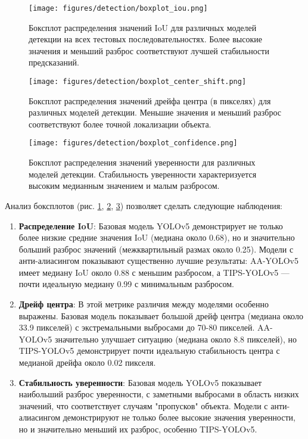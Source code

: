 \begin{figure}[ht]
\centering
\texttt{[image: figures/detection/boxplot\_iou.png]}
\caption{Боксплот распределения значений IoU для различных моделей детекции на всех тестовых последовательностях. Более высокие значения и меньший разброс соответствуют лучшей стабильности предсказаний.}
\label{fig:boxplot_iou}
\end{figure}

\begin{figure}[ht]
\centering
\texttt{[image: figures/detection/boxplot\_center\_shift.png]}
\caption{Боксплот распределения значений дрейфа центра (в пикселях) для различных моделей детекции. Меньшие значения и меньший разброс соответствуют более точной локализации объекта.}
\label{fig:boxplot_center_shift}
\end{figure}

\begin{figure}[ht]
\centering
\texttt{[image: figures/detection/boxplot\_confidence.png]}
\caption{Боксплот распределения значений уверенности для различных моделей детекции. Стабильность уверенности характеризуется высоким медианным значением и малым разбросом.}
\label{fig:boxplot_confidence}
\end{figure}

Анализ боксплотов (рис. \ref{fig:boxplot_iou}, \ref{fig:boxplot_center_shift}, \ref{fig:boxplot_confidence}) позволяет сделать следующие наблюдения:

\begin{enumerate}
    \item \textbf{Распределение IoU}: Базовая модель YOLOv5 демонстрирует не только более низкие средние значения IoU (медиана около 0.68), но и значительно больший разброс значений (межквартильный размах около 0.25). Модели с анти-алиасингом показывают существенно лучшие результаты: AA-YOLOv5 имеет медиану IoU около 0.88 с меньшим разбросом, а TIPS-YOLOv5 — почти идеальную медиану 0.99 с минимальным разбросом.
    
    \item \textbf{Дрейф центра}: В этой метрике различия между моделями особенно выражены. Базовая модель показывает большой дрейф центра (медиана около 33.9 пикселей) с экстремальными выбросами до 70-80 пикселей. AA-YOLOv5 значительно улучшает ситуацию (медиана около 8.8 пикселей), но TIPS-YOLOv5 демонстрирует почти идеальную стабильность центра с медианой дрейфа около 0.02 пикселя.
    
    \item \textbf{Стабильность уверенности}: Базовая модель YOLOv5 показывает наибольший разброс уверенности, с заметными выбросами в область низких значений, что соответствует случаям "пропусков" объекта. Модели с анти-алиасингом демонстрируют не только более высокие значения уверенности, но и значительно меньший их разброс, особенно TIPS-YOLOv5.
\end{enumerate}

